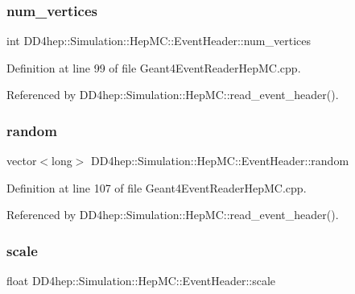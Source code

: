 \subsubsection{\texorpdfstring{num\+\_\+vertices}{num\_vertices}}
{\footnotesize\ttfamily int D\+D4hep\+::\+Simulation\+::\+Hep\+M\+C\+::\+Event\+Header\+::num\+\_\+vertices}



Definition at line 99 of file Geant4\+Event\+Reader\+Hep\+M\+C.\+cpp.



Referenced by D\+D4hep\+::\+Simulation\+::\+Hep\+M\+C\+::read\+\_\+event\+\_\+header().

\hypertarget{class_d_d4hep_1_1_simulation_1_1_hep_m_c_1_1_event_header_af705e3b582d71aef2b82d27e1056952b}{}\label{class_d_d4hep_1_1_simulation_1_1_hep_m_c_1_1_event_header_af705e3b582d71aef2b82d27e1056952b} 
\subsubsection{\texorpdfstring{random}{random}}
{\footnotesize\ttfamily vector$<$long$>$ D\+D4hep\+::\+Simulation\+::\+Hep\+M\+C\+::\+Event\+Header\+::random}



Definition at line 107 of file Geant4\+Event\+Reader\+Hep\+M\+C.\+cpp.



Referenced by D\+D4hep\+::\+Simulation\+::\+Hep\+M\+C\+::read\+\_\+event\+\_\+header().

\hypertarget{class_d_d4hep_1_1_simulation_1_1_hep_m_c_1_1_event_header_a68ba7289f036ebb18a5ae1d6c602bfa8}{}\label{class_d_d4hep_1_1_simulation_1_1_hep_m_c_1_1_event_header_a68ba7289f036ebb18a5ae1d6c602bfa8} 
\subsubsection{\texorpdfstring{scale}{scale}}
{\footnotesize\ttfamily float D\+D4hep\+::\+Simulation\+::\+Hep\+M\+C\+::\+Event\+Header\+::scale}



